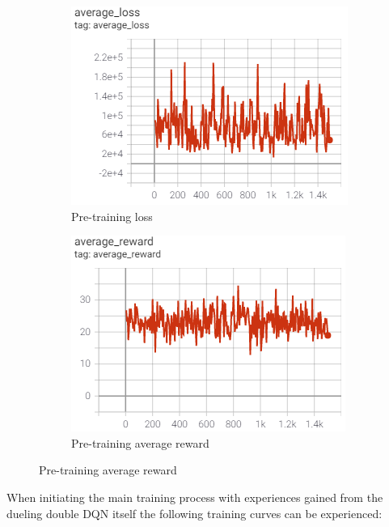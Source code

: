 \begin{figure}[ht]
	\centering
	\begin{subfigure}[b]{0.49\textwidth}
		\centering
		\includegraphics[width=\textwidth]{figures/training1-pre-loss.PNG}
		\caption{Pre-training loss}
		\label{fig:pre-loss-1}
	\end{subfigure}
	\hfill
	\begin{subfigure}[b]{0.49\textwidth}
		\centering
		\includegraphics[width=\textwidth]{figures/training1-pre-reward.PNG}
		\caption{Pre-training average reward}
		\label{fig:pre-reward-1}
	\end{subfigure}
\end{figure}

When initiating the main training process with experiences gained from the dueling double DQN itself the following training curves can be experienced:

